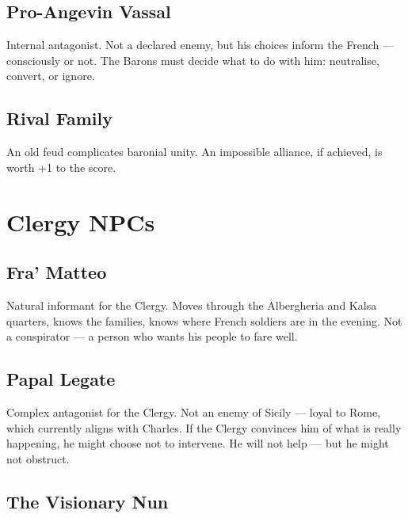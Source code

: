 \subsection{Pro-Angevin Vassal}

Internal antagonist. Not a declared enemy, but his choices inform
the French --- consciously or not. The Barons must decide what to do
with him: neutralise, convert, or ignore.

\subsection{Rival Family}

An old feud complicates baronial unity. An impossible alliance,
if achieved, is worth +1 to the score.

\secsep

\section{Clergy NPCs}

\subsection{Fra' Matteo}

Natural informant for the Clergy. Moves through the Albergheria and
Kalsa quarters, knows the families, knows where French soldiers are
in the evening. Not a conspirator --- a person who wants his people
to fare well.

\subsection{Papal Legate}

Complex antagonist for the Clergy. Not an enemy of Sicily --- loyal
to Rome, which currently aligns with Charles. If the Clergy convinces
him of what is really happening, he might choose not to intervene.
He will not help --- but he might not obstruct.

\subsection{The Visionary Nun}

